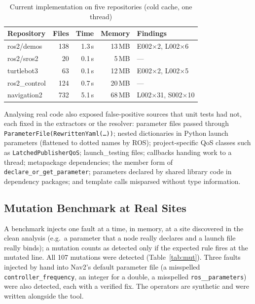 \documentclass[conference]{IEEEtran}
\newcommand{\code}[1]{\texttt{#1}}
\begin{document}
\begin{table}[t]
\centering
\caption{Current implementation on five repositories (cold cache, one thread)}
\label{tab:five}
\footnotesize
\begin{tabular}{@{}lrrrl@{}}
\toprule
Repository & Files & Time & Memory & Findings\\
\midrule
ros2/demos     & 138 & 1.3\,s & 13\,MB & E002$\times$2, L002$\times$6\\
ros2/sros2     &  20 & 0.1\,s &  5\,MB & ---\\
turtlebot3     &  63 & 0.1\,s & 12\,MB & E002$\times$2, L002$\times$5\\
ros2\_control  & 124 & 0.7\,s & 20\,MB & ---\\
navigation2    & 732 & 5.1\,s & 68\,MB & L002$\times$31, S002$\times$10\\
\bottomrule
\end{tabular}
\end{table}

Analysing real code also exposed false-positive sources that unit tests had not, each fixed in
the extractors or the resolver: parameter files passed through
\code{ParameterFile(RewrittenYaml(\dots))}; nested dictionaries in Python launch parameters
(flattened to dotted names by ROS); project-specific QoS classes such as
\code{LatchedPublisherQoS}; launch\_testing files; callbacks handing work to a thread;
metapackage dependencies; the member form of \code{declare\_or\_get\_parameter}; parameters
declared by shared library code in dependency packages; and template calls misparsed without
type information.

\subsection{Mutation Benchmark at Real Sites}
\label{sec:mutation}

A benchmark injects one fault at a time, in memory, at a site discovered in the clean analysis
(e.g.\ a parameter that a node really declares and a launch file really binds); a mutation counts
as detected only if the expected rule fires at the mutated line. All 107 mutations were detected
(Table~\ref{tab:mut}). Three faults injected by hand into Nav2's default parameter file (a
misspelled \code{controller\_frequency}, an integer for a double, a misspelled
\code{ros\_\_parameters}) were also detected, each with a verified fix. The operators are
synthetic and were written alongside the tool.
\end{document}
